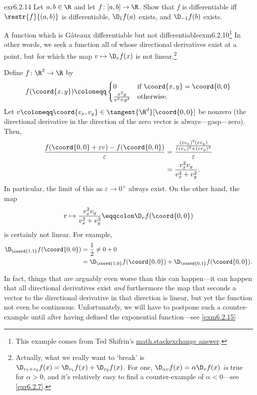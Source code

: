 \begin{exr}{}{exr6.2.14}
Let $a,b\in \R$ and let $f\colon [a,b]\rightarrow \R$.  Show that $f$ is differentiable iff $\restr{f}{(a,b)}$ is differentiable, $\D _1f(a)$ exists, and $\D _{-1}f(b)$ exists.
\end{exr}
\begin{exm}{A function which is Gâteaux differentiable but not differentiable}{exm6.2.10}\footnote{This example comes from Ted Shifrin's \href{http://math.stackexchange.com/questions/694486/show-that-the-directional-derivative-is-linear-by-definition}{math.stackexchange answer}.}
In other words, we seek a function all of whose directional derivatives exist at a point, but for which the map $v\mapsto \D _vf(x)$ is not linear.\footnote{Actually, what we really want to `break' is $\D _{v_1+v_2}f(x)=\D _{v_1}f(x)+\D _{v_2}f(x)$.  For one, $\D _{\alpha v}f(x)=\alpha \D _vf(x)$ \emph{is} true for $\alpha >0$, and it's relatively easy to find a counter-example of $\alpha <0$---see \cref{exr6.2.7}.}

Define $f\colon \R ^2\rightarrow \R$ by
\begin{equation}
f(\coord{x,y})\coloneqq \begin{cases}0 & \text{if }\coord{x,y}=\coord{0,0} \\ \frac{x^2y}{x^2+y^2} & \text{otherwise.}\end{cases}
\end{equation}
Let $v\coloneqq \coord{v_x,v_y}\in \tangent{\R ^d}[\coord{0,0}]$ be nonzero (the directional derivative in the direction of the zero vector is always---gasp---zero).  Then,
\begin{equation}
\begin{split}
\frac{f(\coord{0,0}+\varepsilon v)-f(\coord{0,0})}{\varepsilon} & =\frac{\frac{(\varepsilon v_x)^2(\varepsilon v_y)}{(\varepsilon v_x)^2+(\varepsilon v_y)^2}}{\varepsilon} \\
& =\frac{v_x^2v_y}{v_x^2+v_y^2}.
\end{split}
\end{equation}
In particular, the limit of this as $\varepsilon \to 0^+$ always exist.  On the other hand, the map
\begin{equation}
v\mapsto \frac{v_x^2v_y}{v_x^2+v_y^2}\eqqcolon \D _vf(\coord{0,0})
\end{equation}
is certainly not linear.  For example,
\begin{equation}
\begin{split}
\D _{\coord{1,1}}f(\coord{0,0}) & =\frac{1}{2}\neq 0+0 \\
& =\D _{\coord{1,0}}f(\coord{0,0})+\D _{\coord{0,1}}f(\coord{0,0}).
\end{split}
\end{equation}
\end{exm}
In fact, things that are arguably even worse than this can happen---it can happen that all directional derivatives exist \emph{and} furthermore the map that seconds a vector to the directional derivative in that direction is linear, but yet the function not even be continuous.  Unfortunately, we will have to postpone such a counter-example until after having defined the exponential function---see \cref{exm6.2.15}

